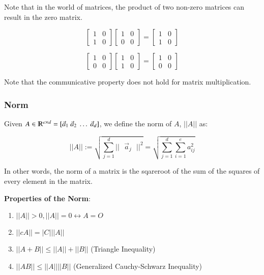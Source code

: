 \documentclass [12 pt, twoside] {book}
\newcommand\+{\text{ }}
\begin{document}
Note that in the world of matrices, the product of two non-zero matrices can
result in the zero matrix.

\[
    \left[\begin{array}{cc}
        1 & 0 \\
        1 & 0
    \end{array}\right]
    \left[\begin{array}{cc}
        1 & 0 \\
        0 & 0
    \end{array}\right]
    =
    \left[\begin{array}{cc}
        1 & 0 \\
        1 & 0
    \end{array}\right]
\]

\[
    \left[\begin{array}{cc}
        1 & 0 \\
        0 & 0
    \end{array}\right]
    \left[\begin{array}{cc}
        1 & 0 \\
        1 & 0
    \end{array}\right]
    =
    \left[\begin{array}{cc}
        1 & 0 \\
        0 & 0
    \end{array}\right]
\]

Note that the communicative property does not hold for matrix multiplication.

\subsubsection{Norm}

Given $A \in \varmathbb{R}^{e \times d} = [\vec{a}_1 \+ \vec{a}_2 \+ \dots \+
\vec{a}_d]$, we define the norm of $A$, $||A||$ as:

\[
    ||A|| := \sqrt{\sum_{j = 1}^d ||\+\vec{a}_j\+||^2} = \sqrt{\sum_{j=1}^d
    \sum_{i=1}^e a_{ij}^2}
\]

In other words, the norm of a matrix is the sqareroot of the sum of the squares
of every element in the matrix.

\textbf{Properties of the Norm}:
\begin{enumerate}
    \item $||A|| > 0, ||A|| = 0 \leftrightarrow A = O$
    \item $||cA|| = |C|||A||$
    \item $||A+B|| \leq ||A|| + ||B||$ (Triangle Inequality)
    \item $||AB|| \leq ||A||||B||$ (Generalized Cauchy-Schwarz Inequality)
\end{enumerate}
\end{document}
